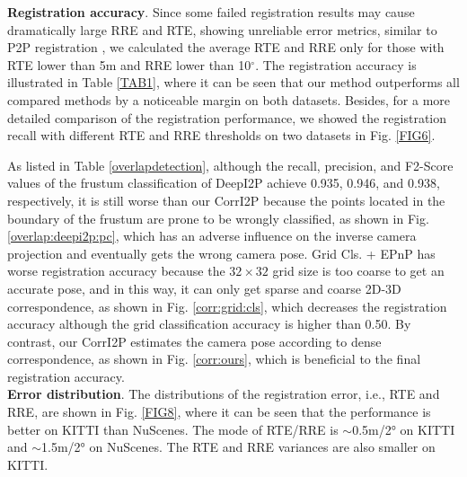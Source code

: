 \documentclass[lettersize,journal]{IEEEtran}
\begin{document}
\noindent\textbf{Registration accuracy}.  Since some failed registration results may cause dramatically large RRE and RTE, showing unreliable error metrics, similar to P2P registration \cite{POINTDSC,HREGNET}, we calculated the average RTE and RRE only for those with RTE lower than 5m and RRE lower than 10$^{\circ}$. The registration accuracy is illustrated in Table \ref{TAB1}, where it can be seen that our method outperforms all compared methods by a noticeable margin on both datasets. Besides, for a more detailed comparison of the registration performance, we showed the registration recall with different RTE and RRE thresholds on two datasets in Fig. \ref{FIG6}.

As listed in Table \ref{overlapdetection}, although the recall, precision, and F2-Score values of the frustum classification of DeepI2P \cite{DEEPI2P} achieve 0.935, 0.946, and 0.938, respectively,  it is still worse than our CorrI2P because the points located in the boundary of the frustum are prone to be wrongly classified, as shown in Fig. \ref{overlap:deepi2p:pc}, which has an adverse influence on the inverse camera projection and eventually gets the wrong camera pose. Grid Cls. + EPnP has worse registration accuracy because the $32\times 32$ grid size is too coarse to get an accurate pose, and in this way, it can only get sparse and coarse 2D-3D correspondence, as shown in Fig. \ref{corr:grid:cls}, which decreases the registration accuracy although the grid classification accuracy is higher than 0.50. By contrast, our CorrI2P estimates the camera pose according to dense correspondence, as shown in Fig. \ref{corr:ours}, which is beneficial to the final registration accuracy. \\

\noindent\textbf{Error distribution}.
The distributions of the registration error, i.e., RTE and RRE, are shown in Fig. \ref{FIG8}, where it can be seen that the performance is better on KITTI than NuScenes. The mode of RTE/RRE is $\sim$0.5m/2° on KITTI and $\sim$1.5m/2° on NuScenes. The RTE and RRE variances are also smaller on KITTI. \\
\end{document}
